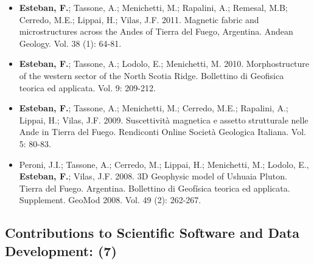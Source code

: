 \documentclass[11pt, a4paper]{article}
\begin{document}
\begin{itemize}
  \item \textbf{Esteban, F.}; Tassone, A.; Menichetti, M.; Rapalini, A.; Remesal, M.B; Cerredo, M.E.; Lippai, H.; Vilas, J.F. 2011. Magnetic fabric and microstructures across the Andes of Tierra del Fuego, Argentina. Andean Geology. Vol. 38 (1): 64-81.

  \item \textbf{Esteban, F.}; Tassone, A.; Lodolo, E.; Menichetti, M. 2010. Morphostructure of the western sector of the North Scotia Ridge. Bollettino di Geofisica teorica ed applicata. Vol. 9: 209-212.

  \item \textbf{Esteban, F.}; Tassone, A.; Menichetti, M.; Cerredo, M.E.; Rapalini, A.; Lippai, H.; Vilas, J.F. 2009. Suscettività magnetica e assetto strutturale nelle Ande in Tierra del Fuego. Rendiconti Online Società Geologica Italiana. Vol. 5: 80-83.

  \item Peroni, J.I.; Tassone, A.; Cerredo, M.; Lippai, H.; Menichetti, M.; Lodolo, E., \textbf{Esteban, F.}; Vilas, J.F. 2008. 3D Geophysic model of Ushuaia Pluton. Tierra del Fuego. Argentina. Bollettino di Geofísica teorica ed applicata. Supplement. GeoMod 2008. Vol. 49 (2): 262-267.
\end{itemize}

\subsection{Contributions to Scientific Software and Data Development: (7)}
\end{document}
